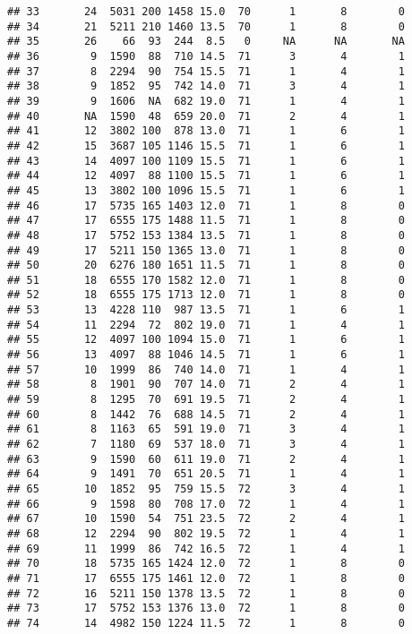 \documentclass{article}\usepackage[]{graphicx}\usepackage[]{color}
\makeatletter
\newenvironment{kframe}{%
 \def\at@end@of@kframe{}%
 \ifinner\ifhmode%
  \def\at@end@of@kframe{\end{minipage}}%
  \begin{minipage}{\columnwidth}%
 \fi\fi%
 \def\FrameCommand##1{\hskip\@totalleftmargin \hskip-\fboxsep
 \colorbox{shadecolor}{##1}\hskip-\fboxsep
     \hskip-\linewidth \hskip-\@totalleftmargin \hskip\columnwidth}%
 \MakeFramed {\advance\hsize-\width
   \@totalleftmargin\z@ \linewidth\hsize
   \@setminipage}}%
 {\par\unskip\endMakeFramed%
 \at@end@of@kframe}
\newenvironment{knitrout}{}{} %
\makeatother
\begin{document}
\begin{knitrout}
\begin{kframe}
\begin{verbatim}
## 33       24  5031 200 1458 15.0  70      1       8        0
## 34       21  5211 210 1460 13.5  70      1       8        0
## 35       26    66  93  244  8.5   0     NA      NA       NA
## 36        9  1590  88  710 14.5  71      3       4        1
## 37        8  2294  90  754 15.5  71      1       4        1
## 38        9  1852  95  742 14.0  71      3       4        1
## 39        9  1606  NA  682 19.0  71      1       4        1
## 40       NA  1590  48  659 20.0  71      2       4        1
## 41       12  3802 100  878 13.0  71      1       6        1
## 42       15  3687 105 1146 15.5  71      1       6        1
## 43       14  4097 100 1109 15.5  71      1       6        1
## 44       12  4097  88 1100 15.5  71      1       6        1
## 45       13  3802 100 1096 15.5  71      1       6        1
## 46       17  5735 165 1403 12.0  71      1       8        0
## 47       17  6555 175 1488 11.5  71      1       8        0
## 48       17  5752 153 1384 13.5  71      1       8        0
## 49       17  5211 150 1365 13.0  71      1       8        0
## 50       20  6276 180 1651 11.5  71      1       8        0
## 51       18  6555 170 1582 12.0  71      1       8        0
## 52       18  6555 175 1713 12.0  71      1       8        0
## 53       13  4228 110  987 13.5  71      1       6        1
## 54       11  2294  72  802 19.0  71      1       4        1
## 55       12  4097 100 1094 15.0  71      1       6        1
## 56       13  4097  88 1046 14.5  71      1       6        1
## 57       10  1999  86  740 14.0  71      1       4        1
## 58        8  1901  90  707 14.0  71      2       4        1
## 59        8  1295  70  691 19.5  71      2       4        1
## 60        8  1442  76  688 14.5  71      2       4        1
## 61        8  1163  65  591 19.0  71      3       4        1
## 62        7  1180  69  537 18.0  71      3       4        1
## 63        9  1590  60  611 19.0  71      2       4        1
## 64        9  1491  70  651 20.5  71      1       4        1
## 65       10  1852  95  759 15.5  72      3       4        1
## 66        9  1598  80  708 17.0  72      1       4        1
## 67       10  1590  54  751 23.5  72      2       4        1
## 68       12  2294  90  802 19.5  72      1       4        1
## 69       11  1999  86  742 16.5  72      1       4        1
## 70       18  5735 165 1424 12.0  72      1       8        0
## 71       17  6555 175 1461 12.0  72      1       8        0
## 72       16  5211 150 1378 13.5  72      1       8        0
## 73       17  5752 153 1376 13.0  72      1       8        0
## 74       14  4982 150 1224 11.5  72      1       8        0

\end{verbatim}
\end{kframe}
\end{knitrout}
\end{document}
